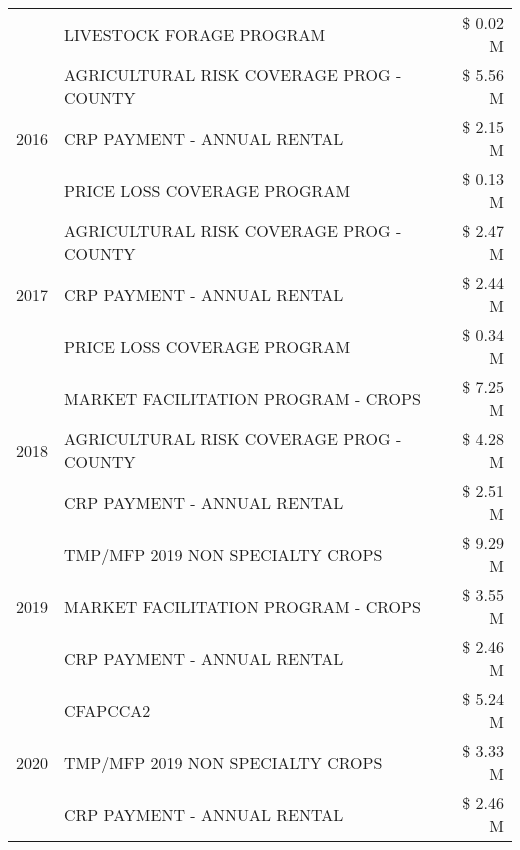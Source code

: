 \begin{tabular}{llr}
 & LIVESTOCK FORAGE PROGRAM & \$ 0.02 M \\
\cline{1-3}
\multirow[t]{3}{*}{2016} & AGRICULTURAL RISK COVERAGE PROG - COUNTY      & \$ 5.56 M \\
 & CRP PAYMENT - ANNUAL RENTAL                   & \$ 2.15 M \\
 & PRICE LOSS COVERAGE PROGRAM                   & \$ 0.13 M \\
\cline{1-3}
\multirow[t]{3}{*}{2017} & AGRICULTURAL RISK COVERAGE PROG - COUNTY & \$ 2.47 M \\
 & CRP PAYMENT - ANNUAL RENTAL & \$ 2.44 M \\
 & PRICE LOSS COVERAGE PROGRAM & \$ 0.34 M \\
\cline{1-3}
\multirow[t]{3}{*}{2018} & MARKET FACILITATION PROGRAM - CROPS & \$ 7.25 M \\
 & AGRICULTURAL RISK COVERAGE PROG - COUNTY & \$ 4.28 M \\
 & CRP PAYMENT - ANNUAL RENTAL & \$ 2.51 M \\
\cline{1-3}
\multirow[t]{3}{*}{2019} & TMP/MFP 2019 NON SPECIALTY CROPS & \$ 9.29 M \\
 & MARKET FACILITATION PROGRAM - CROPS & \$ 3.55 M \\
 & CRP PAYMENT - ANNUAL RENTAL & \$ 2.46 M \\
\cline{1-3}
\multirow[t]{3}{*}{2020} & CFAPCCA2 & \$ 5.24 M \\
 & TMP/MFP 2019 NON SPECIALTY CROPS & \$ 3.33 M \\
 & CRP PAYMENT - ANNUAL RENTAL & \$ 2.46 M \\
\cline{1-3}
\bottomrule
\end{tabular}
